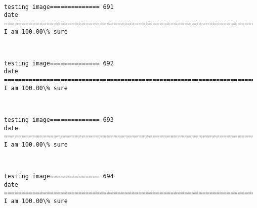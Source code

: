 \documentclass[11pt]{article}
\begin{document}
    \begin{center}
    \end{center}
    { \hspace*{\fill} \\}
    
    \begin{Verbatim}[commandchars=\\\{\}]
testing image============== 691
date
============================================================================
I am 100.00\% sure

    \end{Verbatim}

    \begin{center}
    \end{center}
    { \hspace*{\fill} \\}
    
    \begin{Verbatim}[commandchars=\\\{\}]
testing image============== 692
date
============================================================================
I am 100.00\% sure

    \end{Verbatim}

    \begin{center}
    \end{center}
    { \hspace*{\fill} \\}
    
    \begin{Verbatim}[commandchars=\\\{\}]
testing image============== 693
date
============================================================================
I am 100.00\% sure

    \end{Verbatim}

    \begin{center}
    \end{center}
    { \hspace*{\fill} \\}
    
    \begin{Verbatim}[commandchars=\\\{\}]
testing image============== 694
date
============================================================================
I am 100.00\% sure

    \end{Verbatim}
\end{document}
